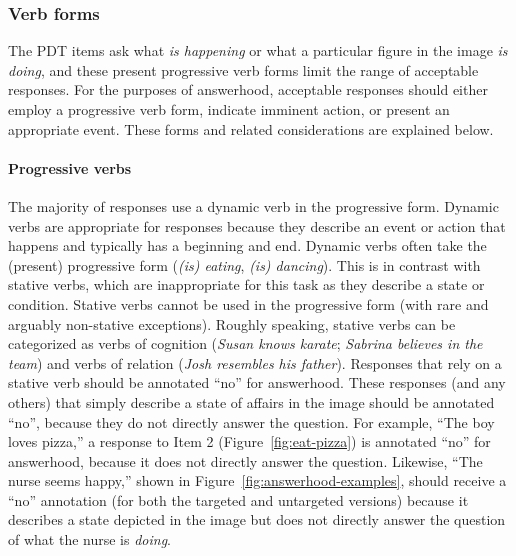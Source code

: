 \documentclass[12pt,notitlepage]{article}
\begin{document}

\subsubsection{Verb forms}
\label{subsubsection:answerhood-verbs}
The PDT items ask what \textit{is happening} or what a particular figure in the image \textit{is doing}, and these present progressive verb forms limit the range of acceptable responses. For the purposes of answerhood, acceptable responses should either employ a progressive verb form,  indicate imminent action, or present an appropriate event. These forms and related considerations are explained below.


\paragraph{Progressive verbs} The majority of responses use a dynamic verb in the progressive form. Dynamic verbs are appropriate for responses because they describe an event or action that happens and typically has a beginning and end. Dynamic verbs often take the (present) progressive form (\textit{(is) eating}, \textit{(is) dancing}). This is in contrast with stative verbs, which are inappropriate for this task as they describe a state or condition. Stative verbs cannot be used in the progressive form (with rare and arguably non-stative exceptions). Roughly speaking, stative verbs can be categorized as verbs of cognition (\textit{Susan knows karate}; \textit{Sabrina believes in the team}) and verbs of relation (\textit{Josh resembles his father}). Responses that rely on a stative verb should be annotated ``no'' for answerhood. These responses (and any others) that simply describe a state of affairs in the image should be annotated ``no'', because they do not directly answer the question. For example, ``The boy loves pizza,'' a response to Item 2 (Figure~\ref{fig:eat-pizza}) is annotated ``no'' for answerhood, because it does not directly answer the question. Likewise, ``The nurse seems happy,'' shown in Figure~\ref{fig:answerhood-examples}, should receive a ``no'' annotation (for both the targeted and untargeted versions) because it describes a state depicted in the image but does not directly answer the question of what the nurse is \textit{doing}.
\end{document}
